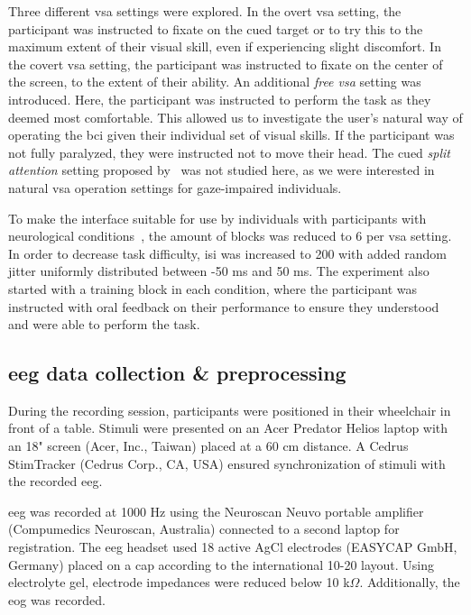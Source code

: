 \documentclass[twocolumn]{article}
\begin{document}
Three different \ac{vsa} settings were explored.
In the overt \ac{vsa} setting, the participant was instructed to fixate on the cued target or
to try this to the maximum extent of their visual skill, even if experiencing
slight discomfort.
In the covert \ac{vsa} setting, the participant was instructed to fixate on the center of the
screen, to the extent of their ability.
An additional \emph{free \ac{vsa}} setting was introduced.
Here, the participant was instructed to perform the task as they deemed most
comfortable.
This allowed us to investigate the user's natural way of operating the \ac{bci}
given their individual set of visual skills.
If the participant was not fully paralyzed, they were instructed not to move their head.
The cued \emph{split attention} setting proposed
by~\textcite{VanDenKerchove2024} was not studied here, as we were interested
in natural \ac{vsa} operation settings for gaze-impaired individuals.

To make the interface suitable for use by individuals with
participants with neurological conditions~\cite{FriedOken2020}, the amount of blocks was reduced to 6 per \ac{vsa} setting.
In order to decrease task difficulty, \ac{isi} was increased to 200 with added random jitter uniformly distributed
between -50 ms and 50 ms.
The experiment also started with a training block in each condition, where the
participant was instructed with oral feedback on their performance to ensure they
understood and were able to perform the task.


\subsection{\Ac{eeg} data collection \& preprocessing}

During the recording session, participants were positioned in their wheelchair in front of a table.
Stimuli were presented on an Acer Predator Helios laptop with an 18" screen (Acer,
Inc., Taiwan) placed at a 60 cm distance.
A Cedrus StimTracker (Cedrus Corp., CA, USA) ensured synchronization of stimuli with the
recorded \ac{eeg}.

\Ac{eeg} was recorded at 1000 Hz using the Neuroscan Neuvo portable amplifier (Compumedics Neuroscan,
Australia) connected to a second laptop for registration.
The \ac{eeg} headset used 18 active AgCl electrodes (EASYCAP GmbH, Germany) placed on a cap
according to the international 10-20 layout.
Using electrolyte gel, electrode impedances were reduced below 10 k$\Omega$.
Additionally, the \ac{eog} was recorded.
\end{document}
